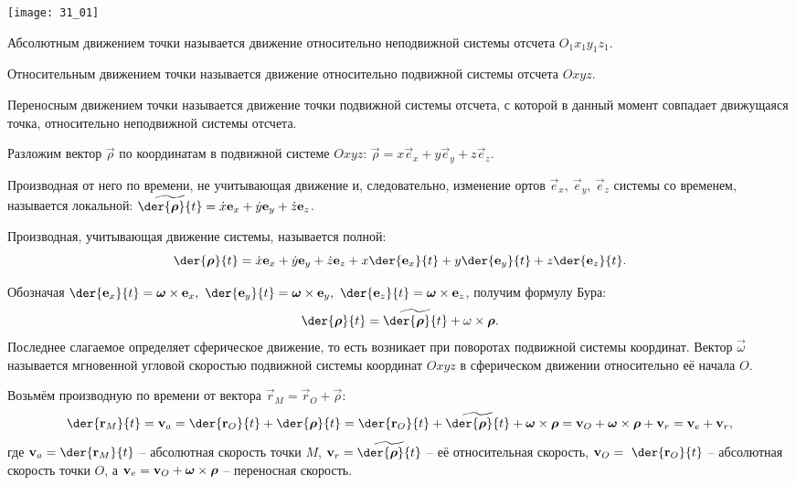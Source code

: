 
\begin{minipage}{.4\textwidth}
    \texttt{[image: 31\_01]}
\end{minipage}\hfill
\begin{minipage}{.55\textwidth}
    Абсолютным движением точки называется движение относительно неподвижной
    системы отсчета \( O_1x_1y_1z_1 \).
    
    Относительным движением точки называется движение относительно подвижной
    системы отсчета \( Oxyz \).
    
    Переносным движением точки называется движение точки подвижной системы
    отсчета, с которой в данный момент совпадает движущаяся точка, относительно
    неподвижной системы отсчета.
\end{minipage}

Разложим вектор \( \vec{\rho} \) по координатам в подвижной системе \( Oxyz \):
\( \vec{\rho} = x\vec{e}_x + y\vec{e}_y + z\vec{e}_z \).

Производная от него по времени, не учитывающая движение и, следовательно,
изменение ортов \( \vec{e}_x,\ \vec{e}_y,\ \vec{e}_z \) системы со временем,
называется локальной:
\( \ds \widetilde{\der{\vec{\rho}}{t}} = \dot{x}\vec{e}_x + \dot{y}\vec{e}_y +
\dot{z}\vec{e}_z \).

Производная, учитывающая движение системы, называется полной:
\[
    \der{\vec{\rho}}{t} = \dot{x}\vec{e}_x + \dot{y}\vec{e}_y + \dot{z}\vec{e}_z
    + x\der{\vec{e}_x}{t} + y\der{\vec{e}_y}{t} + z\der{\vec{e}_z}{t}.
\]

Обозначая \( \ds \der{\vec{e}_x}{t} = \vec{\omega}\times\vec{e}_x,\ 
\der{\vec{e}_y}{t} = \vec{\omega}\times\vec{e}_y,\ \der{\vec{e}_z}{t} =
\vec{\omega}\times\vec{e}_z \), получим формулу Бура:
\[
    \der{\vec{\rho}}{t} = \widetilde{\der{\vec{\rho}}{t}} + \omega\times\vec{\rho}.
\]
Последнее слагаемое определяет сферическое движение, то есть возникает при
поворотах подвижной системы координат. Вектор \( \vec{\omega} \) называется
мгновенной угловой скоростью подвижной системы координат \( Oxyz \) в
сферическом движении относительно её начала \( O \).

Возьмём производную по времени от вектора
\( \vec{r}_M = \vec{r}_O + \vec{\rho} \):
\[
    \der{\vec{r}_M}{t} = \vec{v}_a = \der{\vec{r}_O}{t} + \der{\vec{\rho}}{t} =
    \der{\vec{r}_O}{t} + \widetilde{\der{\vec{\rho}}{t}} +
    \vec{\omega}\times\vec{\rho} = \vec{v}_O + \vec{\omega}\times\vec{\rho} +
    \vec{v}_r = \vec{v}_e + \vec{v}_r,
\]
где \( \ds \vec{v}_a = \der{\vec{r}_M}{t} \) -- абсолютная скорость точки
\( M \), \( \ds\vec{v}_r=\widetilde{\der{\vec{\rho}}{t}} \) -- её относительная
скорость, \( \ds \vec{v}_O =~\der{\vec{r}_O}{t} \) -- абсолютная скорость точки
\( O \), а \( \displaystyle \boldsymbol{\mathrm{v}}_e = \boldsymbol{\mathrm{v}}_O + \boldsymbol{\mathrm{\omega}}\times\boldsymbol{\mathrm{\rho}} \) --
переносная скорость.

